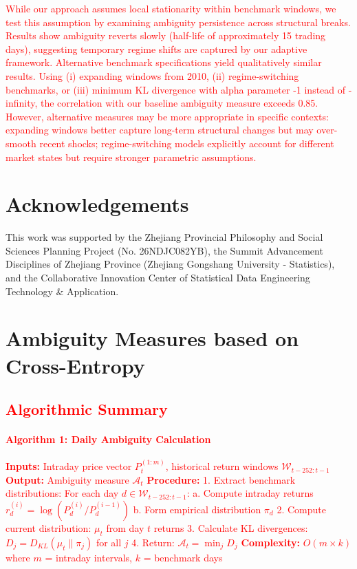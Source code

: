 \documentclass[preprint,12pt,authoryear]{elsarticle}
\begin{document}
\textcolor{red}{While our approach assumes local stationarity within benchmark windows, we test this assumption by examining ambiguity persistence across structural breaks. Results show ambiguity reverts slowly (half-life of approximately 15 trading days), suggesting temporary regime shifts are captured by our adaptive framework. Alternative benchmark specifications yield qualitatively similar results. Using (i) expanding windows from 2010, (ii) regime-switching benchmarks, or (iii) minimum KL divergence with alpha parameter -1 instead of -infinity, the correlation with our baseline ambiguity measure exceeds 0.85. However, alternative measures may be more appropriate in specific contexts: expanding windows better capture long-term structural changes but may over-smooth recent shocks; regime-switching models explicitly account for different market states but require stronger parametric assumptions.}



\clearpage
\section*{Acknowledgements}
This work was supported by the Zhejiang Provincial Philosophy and Social Sciences Planning Project (No. 26NDJC082YB), the Summit Advancement Disciplines of Zhejiang Province (Zhejiang Gongshang University - Statistics), and the Collaborative Innovation Center of Statistical Data Engineering Technology \& Application.

\appendix

\section{Ambiguity Measures based on Cross-Entropy}
\textcolor{red}{\subsection{Algorithmic Summary}}
\textcolor{red}{\paragraph{Algorithm 1: Daily Ambiguity Calculation}}
\textcolor{red}{\textbf{Inputs:} Intraday price vector $P_{t}^{(1:m)}$, historical return windows $\mathcal{W}_{t-252:t-1}$}
\textcolor{red}{\textbf{Output:} Ambiguity measure $\mathcal{A}_t$}
\textcolor{red}{\textbf{Procedure:}}
\textcolor{red}{1. Extract benchmark distributions: For each day $d \in \mathcal{W}_{t-252:t-1}$:}
\textcolor{red}{\quad a. Compute intraday returns $r^{(i)}_d = \log(P^{(i)}_d/P^{(i-1)}_d)$}
\textcolor{red}{\quad b. Form empirical distribution $\pi_d$}
\textcolor{red}{2. Compute current distribution: $\mu_t$ from day $t$ returns}
\textcolor{red}{3. Calculate KL divergences: $D_j = D_{KL}(\mu_t \| \pi_j)$ for all $j$}
\textcolor{red}{4. Return: $\mathcal{A}_t = \min_j D_j$}
\textcolor{red}{\textbf{Complexity:} $O(m \times k)$ where $m$ = intraday intervals, $k$ = benchmark days}
\end{document}
